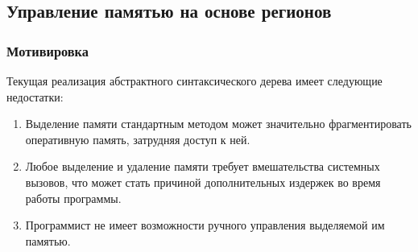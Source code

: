 \documentclass[coursework]{SCWorks}
\begin{document}

\date{2021}

\maketitle

\secNumbering






\subsection{Управление памятью на основе регионов}
\subsubsection{Мотивировка}
Текущая реализация абстрактного синтаксического дерева имеет следующие 
недостатки:
\begin{enumerate}
    \item Выделение памяти стандартным методом может значительно фрагментировать
    оперативную память, затрудняя доступ к ней.
    \item Любое выделение и удаление памяти требует вмешательства системных
    вызовов, что может стать причиной дополнительных издержек во время
    работы программы.
    \item Программист не имеет возможности ручного управления выделяемой им
    памятью.
\end{enumerate}
\end{document}
